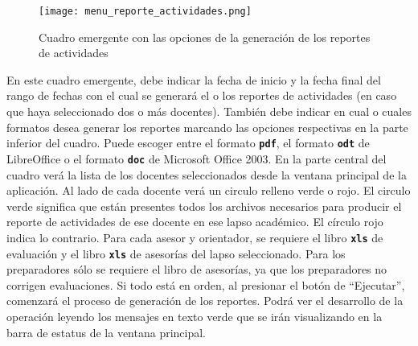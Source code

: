 \documentclass[letterpaper,12pt]{book}
\newcommand{\fileformat}[1]{\textbf{\texttt{#1}}}
\begin{document}
\begin{figure}[!ht]
	\centering
	\texttt{[image: menu\_reporte\_actividades.png]}
	\caption{Cuadro emergente con las opciones de la generación de los reportes de actividades}
	\label{fig:menu_reporte_actividades}
\end{figure}

En este cuadro emergente, debe indicar la fecha de inicio y la fecha final del rango de fechas con el cual se generará el o los reportes de actividades (en caso que haya seleccionado dos o más docentes). También debe indicar en cual o cuales formatos desea generar los reportes marcando las opciones respectivas en la parte inferior del cuadro. Puede escoger entre el formato \fileformat{pdf}, el formato \fileformat{odt} de LibreOffice o el formato \fileformat{doc} de Microsoft Office 2003. En la parte central del cuadro verá la lista de los docentes seleccionados desde la ventana principal de la aplicación. Al lado de cada docente verá un circulo relleno verde o rojo. El circulo verde significa que están presentes todos los archivos necesarios para producir el reporte de actividades de ese docente en ese lapso académico. El círculo rojo indica lo contrario. Para cada asesor y orientador, se requiere el libro \fileformat{xls} de evaluación y el libro \fileformat{xls} de asesorías del lapso seleccionado. Para los preparadores sólo se requiere el libro de asesorías, ya que los preparadores no corrigen evaluaciones. Si todo está en orden, al presionar el botón de ``Ejecutar'', comenzará el proceso de generación de los reportes. Podrá ver el desarrollo de la operación leyendo los mensajes en texto verde que se irán visualizando en la barra de estatus de la ventana principal.  
\end{document}
